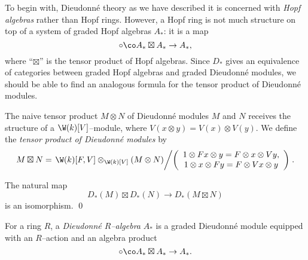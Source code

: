 To begin with, Dieudonn\'e theory as we have described it is concerned with \emph{Hopf algebras} rather than Hopf rings.  However, a Hopf ring is not much structure on top of a system of graded Hopf algebras $A_*$: it is a map \[\circ\co A_* \boxtimes A_* \to A_*,\] where ``$\boxtimes$'' is the tensor product of Hopf algebras.  Since $D_*$ gives an equivalence of categories between graded Hopf algebras and graded Dieudonn\'e modules, we should be able to find an analogous formula for the tensor product of Dieudonn\'e modules.

\begin{definition}
The naive tensor product $M \otimes N$ of Dieudonn\'e modules $M$ and $N$ receives the structure of a $\W(k)[V]$--module, where $V(x \otimes y) = V(x) \otimes V(y)$.  We define the \textit{tensor product of Dieudonn\'e modules} by \[M \boxtimes N = \left.\W(k)[F, V] \otimes_{\W(k)[V]} (M \otimes N) \middle/ \left( \begin{array}{c} 1 \otimes Fx \otimes y = F \otimes x \otimes Vy, \\ 1 \otimes x \otimes Fy = F \otimes Vx \otimes y \end{array} \right) \right. .\]
\end{definition}

\begin{lemma}
The natural map \[D_*(M) \boxtimes D_*(N) \to D_*(M \boxtimes N)\] is an isomorphism. \qed
\end{lemma}

\begin{definition}
For a ring $R$, a \emph{Dieudonn\'e $R$--algebra} $A_*$ is a graded Dieudonn\'e module equipped with an $R$--action and an algebra product \[\circ\co A_* \boxtimes A_* \to A_*.\]
\end{definition}

